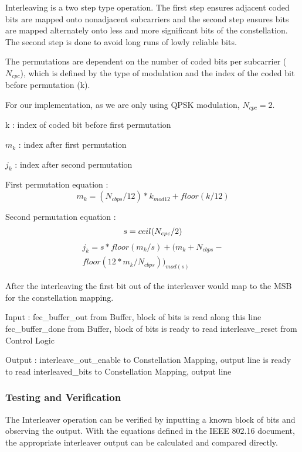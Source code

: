 \documentclass[dvips,10pt,twocolumn]{article}
\begin{document}
	Interleaving is a two step type operation. The first step ensures adjacent 
	coded bits are mapped onto nonadjacent subcarriers and the second step 
	ensures bits are mapped alternately onto less and more significant bits of
	the constellation. The second step is done to avoid long runs of lowly
	reliable bits.
	 
	The permutations are dependent on the number of coded bits per subcarrier
	($N_{cpc}$), which is defined by the type of modulation and the index of the
	coded bit before permutation (k).

	For our implementation, as we are only using QPSK modulation,
	$N_{cpc} = 2$.
	
	k : index of coded bit before first permutation

	$m_{k}$ : index after first permutation

	$j_{k}$ : index after second permutation 

	First permutation equation :
	\begin{equation}
	m_k = (N_{cbps}/12)*k_{mod12}+floor(k/12)
	\end{equation}

	Second permutation equation :
	\begin{equation}
	s=ceil(N_{cpc}/2) \\
	\end{equation}
	\begin{eqnarray}
	j_k = s*floor(m_{k}/s)+(m_{k}+N_{cbps}- \nonumber \\
		floor(12*m_k/N_{cbps}))_{mod(s)}
	\end{eqnarray}

	After the interleaving the first bit out of the interleaver would map to the
	MSB for the constellation mapping. 
	
	Input : 
	fec\_buffer\_out from Buffer, block of bits is read along this line
	fec\_buffer\_done from Buffer, block of bits is ready to read
	interleave\_reset from Control Logic
	
	Output :
	interleave\_out\_enable to Constellation Mapping, output line is ready to read
	interleaved\_bits to Constellation Mapping, output line

	\subsubsection{Testing and Verification}
	
	The Interleaver operation can be verified by inputting a known block of bits
	and observing the output. With the equations defined in the IEEE 802.16
	document, the appropriate interleaver output can be calculated and compared
	directly. 
 
\end{document}
